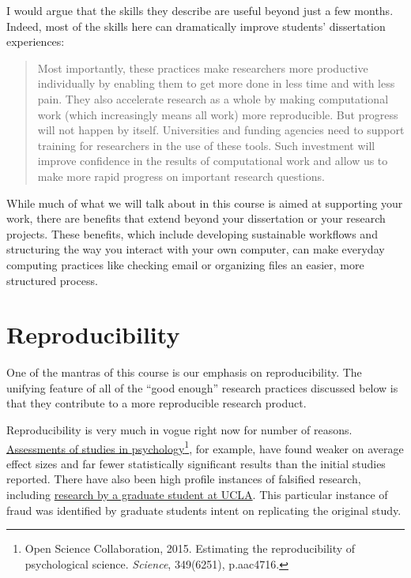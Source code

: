 \documentclass[]{book}
\let\rmarkdownfootnote\footnote%
\def\footnote{\protect\rmarkdownfootnote}
\theoremstyle{definition}
\theoremstyle{definition}
\theoremstyle{remark}
\begin{document}
I would argue that the skills they describe are useful beyond just a few
months. Indeed, most of the skills here can dramatically improve
students' dissertation experiences:

\begin{quote}
Most importantly, these practices make researchers more productive
individually by enabling them to get more done in less time and with
less pain. They also accelerate research as a whole by making
computational work (which increasingly means all work) more
reproducible. But progress will not happen by itself. Universities and
funding agencies need to support training for researchers in the use of
these tools. Such investment will improve confidence in the results of
computational work and allow us to make more rapid progress on important
research questions.
\end{quote}

While much of what we will talk about in this course is aimed at
supporting your work, there are benefits that extend beyond your
dissertation or your research projects. These benefits, which include
developing sustainable workflows and structuring the way you interact
with your own computer, can make everyday computing practices like
checking email or organizing files an easier, more structured process.

\section{Reproducibility}\label{reproducibility}

One of the mantras of this course is our emphasis on reproducibility.
The unifying feature of all of the ``good enough'' research practices
discussed below is that they contribute to a more reproducible research
product.

Reproducibility is very much in vogue right now for number of reasons.
\href{http://science.sciencemag.org/content/349/6251/aac4716}{Assessments
of studies in psychology}\footnote{Open Science Collaboration, 2015.
  Estimating the reproducibility of psychological science.
  \emph{Science}, 349(6251), p.aac4716.}, for example, have found weaker
on average effect sizes and far fewer statistically significant results
than the initial studies reported. There have also been high profile
instances of falsified research, including
\href{http://nymag.com/scienceofus/2015/05/how-a-grad-student-uncovered-a-huge-fraud.html}{research
by a graduate student at UCLA}. This particular instance of fraud was
identified by graduate students intent on replicating the original
study.
\end{document}
